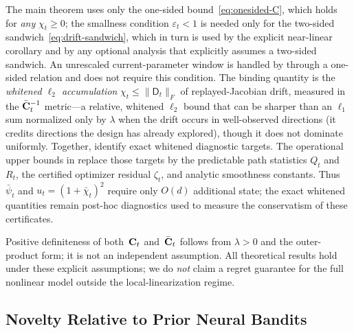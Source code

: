 \documentclass[twoside]{article}
\newcommand{\Dmat}{\mathsf{D}}                  %
\begin{document}
The main theorem uses only the one-sided bound~\eqref{eq:onesided-C}, which
holds for \emph{any} $\chi_t\ge0$; the smallness condition
$\varepsilon_t<1$ is needed only for the two-sided
sandwich~\eqref{eq:drift-sandwich}, which in turn is used by the explicit
near-linear corollary and by any optional analysis that
explicitly assumes a two-sided sandwich.  An unrescaled current-parameter window is
handled by  through a one-sided relation and does not require this
condition.
The binding quantity is the \emph{whitened $\ell_2$ accumulation}
$\chi_t\le\|\Dmat_t\|_F$ of replayed-Jacobian drift, measured in the
$\bar{\mathbf{C}}_t^{-1}$ metric---a relative, whitened $\ell_2$ bound that can be sharper
than an $\ell_1$ sum normalized only by $\lambda$ when the drift occurs in
well-observed directions (it credits directions the design has already
explored), though it does not dominate uniformly.  Together,
 identify exact whitened diagnostic
targets.  The operational upper bounds in  replace
those targets by the predictable path statistics $Q_t$ and $R_t$, the certified
optimizer residual $\zeta_t$, and analytic smoothness constants.  Thus
$\bar\psi_t$ and $u_t=(1+\bar\chi_t)^2$ require only $O(d)$ additional state;
the exact whitened quantities remain post-hoc diagnostics used to measure the
conservatism of these certificates.

Positive definiteness of both~$\mathbf{C}_t$ and~$\bar{\mathbf{C}}_t$ follows from
$\lambda>0$ and the outer-product form; it is not an independent assumption.
All theoretical results hold under these explicit assumptions; we do
\emph{not} claim a regret guarantee for the full nonlinear model outside
the local-linearization regime.



\subsection{Novelty Relative to Prior Neural Bandits}\label{sec:novelty}
\end{document}
